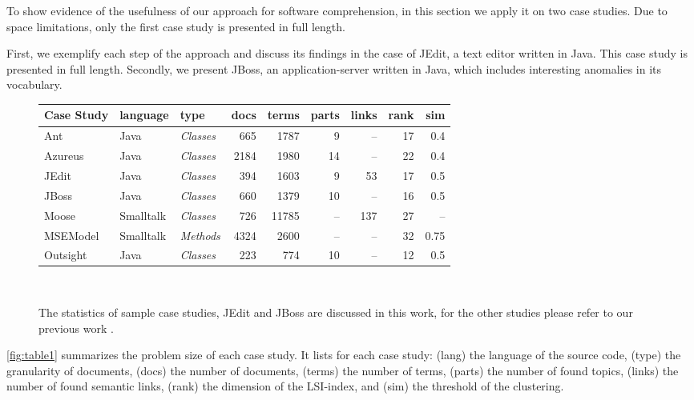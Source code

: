 To show evidence of the usefulness of our approach for software comprehension, in this section we apply it on two case studies. Due to space limitations, only the first case study is presented in full length.

First, we exemplify each step of the approach and discuss its findings in the case of JEdit, a text editor written in Java. This case study is presented in full length. Secondly, we present JBoss, an application-server written in Java, which includes interesting anomalies in its vocabulary.

\begin{figure}[h]
\centering
{\scriptsize
\begin{tabular}{l|llrrrrrr}
\hline
\textbf{Case Study}&\textbf{language}&\textbf{type}&\textbf{docs}&\textbf{terms}
&\textbf{parts}&\textbf{links}&\textbf{rank}&\textbf{sim}\\
\hline
Ant & Java & \emph{Classes} & 665 & 1787 & 9 & -- & 17 & 0.4\\
Azureus & Java & \emph{Classes}       & 2184 & 1980 & 14 & -- & 22 & 0.4\\
JEdit & Java & \emph{Classes}       & 394  & 1603 & 9 & 53 &17 & 0.5\\
JBoss & Java & \emph{Classes}       & 660 & 1379 & 10 & -- & 16 & 0.5\\
Moose\footnotemark{} & Smalltalk & \emph{Classes}  & 726  & 11785 & -- & 137& 27 & --\\
MSEModel & Smalltalk & \emph{Methods}  & 4324  & 2600 & -- & -- & 32 & 0.75\\
Outsight & Java & \emph{Classes}    & 223 & 774 & 10 & -- & 12 & 0.5\\
\hline
\end{tabular}}\\
\caption{The statistics of sample case studies, JEdit and JBoss are discussed in this work, for the other studies please refer to our previous work \cite{Kuhn05a,Kuhn06a}.}\label{fig:table1}
\end{figure}

\autoref{fig:table1} summarizes the problem size of each case study. It lists for each case study: (lang) the language of the source code, (type) the granularity of  documents, (docs) the number of documents, (terms) the number of terms, (parts) the number of found topics, (links) the number of found semantic links, (rank) the dimension of the LSI-index, and (sim) the threshold  of the clustering.

